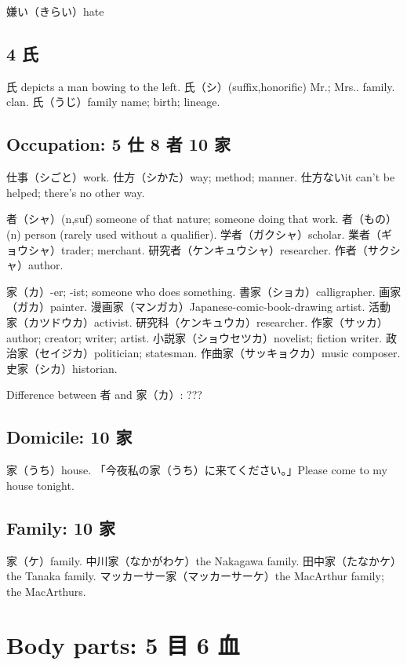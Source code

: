 嫌い（きらい）hate

\subsection{4 氏}

氏 depicts a man bowing to the left.
氏（シ）(suffix,honorific) Mr.; Mrs.. family. clan.
氏（うじ）family name; birth; lineage.

\subsection{Occupation: 5 仕 8 者 10 家}

仕事（シごと）work.
仕方（シかた）way; method; manner.
仕方ないit can't be helped; there's no other way.

者（シャ）(n,suf) someone of that nature; someone doing that work.
者（もの）(n) person (rarely used without a qualifier).
学者（ガクシャ）scholar.
業者（ギョウシャ）trader; merchant.
研究者（ケンキュウシャ）researcher.
作者（サクシャ）author.

家（カ）-er; -ist; someone who does something.
書家（ショカ）calligrapher.
画家（ガカ）painter.
漫画家（マンガカ）Japanese-comic-book-drawing artist.
活動家（カツドウカ）activist.
研究科（ケンキュウカ）researcher.
作家（サッカ）author; creator; writer; artist.
小説家（ショウセツカ）novelist; fiction writer.
政治家（セイジカ）politician; statesman.
作曲家（サッキョクカ）music composer.
史家（シカ）historian.

Difference between 者 and 家（カ）: ???

\subsection{Domicile: 10 家}

家（うち）house.
「今夜私の家（うち）に来てください。」Please come to my house tonight.

\subsection{Family: 10 家}

家（ケ）family.
中川家（なかがわケ）the Nakagawa family.
田中家（たなかケ）the Tanaka family.
マッカーサー家（マッカーサーケ）the MacArthur family; the MacArthurs.

\section{Body parts: 5 目 6 血}

